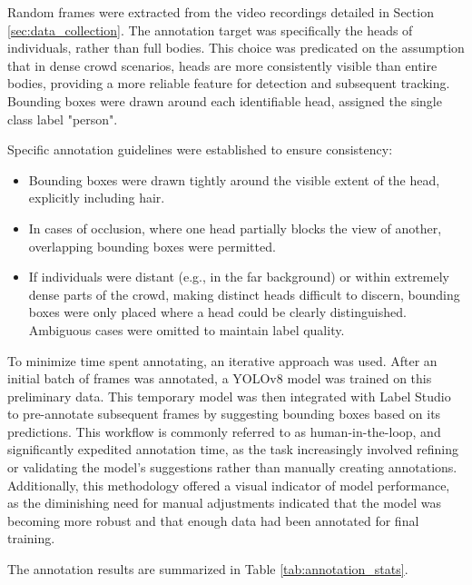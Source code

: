 Random frames were extracted from the video recordings detailed in Section \ref{sec:data_collection}. The annotation target was specifically the heads of individuals, rather than full bodies. This choice was predicated on the assumption that in dense crowd scenarios, heads are more consistently visible than entire bodies, providing a more reliable feature for detection and subsequent tracking. Bounding boxes were drawn around each identifiable head, assigned the single class label "person".

Specific annotation guidelines were established to ensure consistency:
\begin{itemize}
  \item Bounding boxes were drawn tightly around the visible extent of the head, explicitly including hair.
  \item In cases of occlusion, where one head partially blocks the view of another, overlapping bounding boxes were permitted.
  \item If individuals were distant (e.g., in the far background) or within extremely dense parts of the crowd, making distinct heads difficult to discern, bounding boxes were only placed where a head could be clearly distinguished. Ambiguous cases were omitted to maintain label quality.
\end{itemize}

To minimize time spent annotating, an iterative approach was used. After an initial batch of frames was annotated, a YOLOv8 model was trained on this preliminary data. This temporary model was then integrated with Label Studio to pre-annotate subsequent frames by suggesting bounding boxes based on its predictions. This workflow is commonly referred to as human-in-the-loop, and significantly expedited annotation time, as the task increasingly involved refining or validating the model's suggestions rather than manually creating annotations. Additionally, this methodology offered a visual indicator of model performance, as the diminishing need for manual adjustments indicated that the model was becoming more robust and that enough data had been annotated for final training.

The annotation results are summarized in Table \ref{tab:annotation_stats}.

